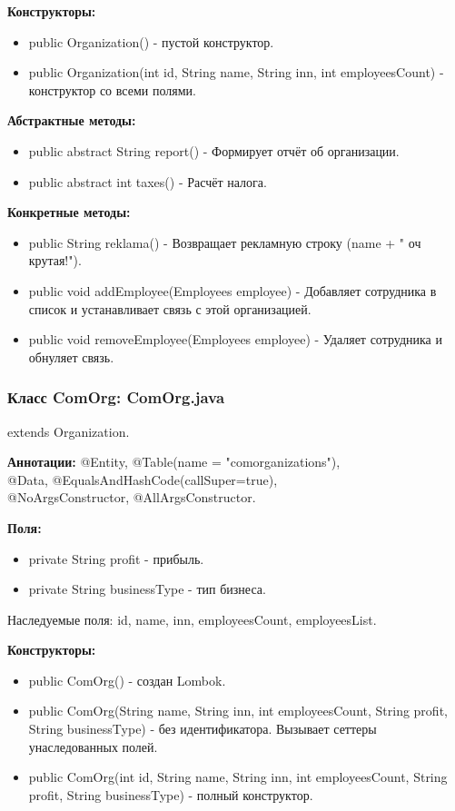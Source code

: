 \documentclass[oneside,a4paper,14pt]{extarticle}
\begin{document}
\textbf{Конструкторы:}
\begin{itemize}
    \item public Organization() - пустой конструктор.
    \item public Organization(int id, String name, String inn, int employeesCount) - конструктор со всеми полями.
\end{itemize}

\textbf{Абстрактные методы:}
\begin{itemize}
    \item public abstract String report() - Формирует отчёт об организации.
    \item public abstract int taxes() - Расчёт налога.
\end{itemize}

\textbf{Конкретные методы:}
\begin{itemize}
    \item public String reklama() - Возвращает рекламную строку (name + " оч крутая!").
    \item public void addEmployee(Employees employee) - Добавляет сотрудника в список и устанавливает связь с этой организацией.
    \item public void removeEmployee(Employees employee) - Удаляет сотрудника и обнуляет связь.
\end{itemize}

\newpage

\subsubsection*{Класс ComOrg: ComOrg.java}

extends Organization.

\textbf{Аннотации:} @Entity, @Table(name = "comorganizations"),\\ @Data, @EqualsAndHashCode(callSuper=true),\\ @NoArgsConstructor, @AllArgsConstructor.

\textbf{Поля:}
\begin{itemize}
    \item private String profit - прибыль.
    \item private String businessType - тип бизнеса.
\end{itemize}

Наследуемые поля: id, name, inn, employeesCount, employeesList.

\textbf{Конструкторы:}
\begin{itemize}
    \item public ComOrg() - создан Lombok.
    \item public ComOrg(String name, String inn, int employeesCount, String profit, String businessType) - без идентификатора. Вызывает сеттеры унаследованных полей.
    \item public ComOrg(int id, String name, String inn, int employeesCount, String profit, String businessType) - полный конструктор.
\end{itemize}
\end{document}
